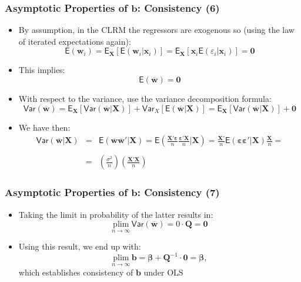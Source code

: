 \documentclass[10pt]{beamer}
\newcommand{\var}{\mathsf{Var}}
\newcommand{\plim}{\mathrm{plim}}
\theoremstyle{definition}
\begin{document}
\begin{frame}[fragile]
\frametitle{Asymptotic Properties of $\mathbf{b}$: Consistency (6)}
\begin{itemize}
	\item By assumption, in the CLRM the regressors are exogenous so (using the law of iterated expectations again):
	\[
		\mathsf{E}(\mathbf{w}_{i}) = \mathsf{E}_{\mathbf{X}}[\mathsf{E}(\mathbf{w}_{i}|\mathbf{x}_{i})] = \mathsf{E}_{\mathbf{X}}[\mathbf{x}_{i}\mathsf{E}(\varepsilon_{i}|\mathbf{x}_{i})] = \mathbf{0}
	\]
	\item This implies:
	\[
		\mathsf{E}(\overline{\mathbf{w}}) = \mathbf{0}
	\]
	\item With respect to the variance, use the variance decomposition formula:
	\[
		\var(\overline{\mathbf{w}}) = \mathsf{E}_{\mathbf{X}}[\var(\mathbf{\overline{\mathbf{w}}|X})] + \var_{X}[\mathsf{E}(\mathbf{\overline{\mathbf{w}}|X})] = \mathsf{E}_{\mathbf{X}}[\var(\mathbf{\overline{\mathbf{w}}|X})] + \mathbf{0}
	\]
	\item We have then:
	\[
		\begin{array}{lcl}
			\var(\overline{\mathbf{w}}|\mathbf{X}) & = & \displaystyle \mathsf{E}(\overline{\mathbf{w}}\overline{\mathbf{w}}'|\mathbf{X}) = \mathsf{E}\left(\frac{\mathbf{X'}\bm\varepsilon}{n}\frac{\bm\varepsilon'\mathbf{X}}{n}|\mathbf{X}\right) = \frac{\mathbf{X'}}{n} \mathsf{E}(\bm\varepsilon\bm\varepsilon'|\mathbf{X})\frac{\mathbf{X}}{n} = \\
			\quad\\
			& = &  \left(\displaystyle\frac{\sigma^{2}}{n}\right) \left(\displaystyle\frac{\mathbf{X'}\mathbf{X}}{n}\right)
		\end{array}
	\]
\end{itemize}
\end{frame}

\begin{frame}[fragile]
\frametitle{Asymptotic Properties of $\mathbf{b}$: Consistency (7)}
\begin{itemize}
	\item Taking the limit in probability of the latter results in:
	\[
		\underset{n\to\infty}{\plim}\, \var(\overline{\mathbf{w}}) = 0\cdot \mathbf{Q} = \mathbf{0}
	\]
	\item Using this result, we end up with:
	\[		
		\underset{n\to\infty}{\plim}\,\mathbf{b} = \bm\beta + \mathbf{Q}^{-1}\cdot \mathbf{0} = \bm\beta,
	\]
	which establishes consistency of $\mathbf{b}$ under OLS
\end{itemize}
\end{frame}
\end{document}
